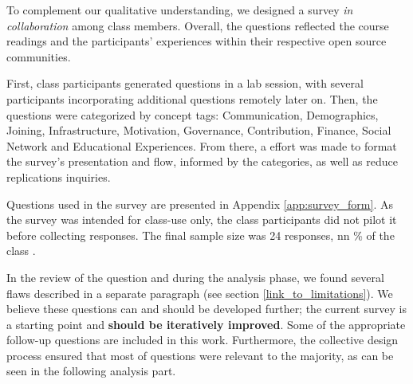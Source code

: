 

To complement our qualitative understanding, we designed a survey {\it in collaboration} among class members. Overall, the questions reflected the course  readings and the participants' experiences within their respective open source communities. 

First, class participants generated questions in a lab session, with several participants incorporating additional questions remotely later on.  Then, the questions were categorized by concept tags: Communication, Demographics, Joining, Infrastructure, Motivation, Governance, Contribution, Finance, Social Network and Educational Experiences. From there, a effort was made to format the survey's  presentation and flow, informed by the categories, as well as reduce replications inquiries.

Questions used in the survey  are presented in Appendix \ref{app:survey_form}. As the survey was intended for class-use only, the class participants did not pilot it before collecting  responses. The final sample size was 24 responses, nn \% of the class .

In the review of the question and during the analysis phase, we found several flaws described in a separate paragraph (see section \ref{link_to_limitations}). We believe these questions can and should be developed further; the current survey is a starting point and {\bf should be iteratively improved}. Some of the appropriate follow-up questions are included in this work. Furthermore, the collective design process ensured that most of questions were relevant to the majority, as can be seen in the following analysis part.